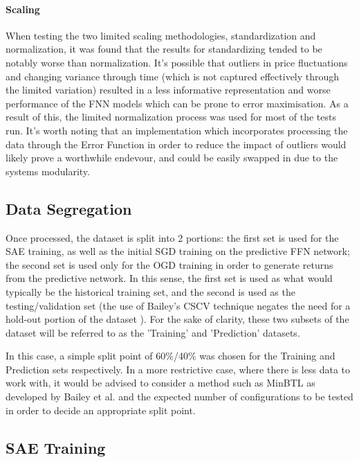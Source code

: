 \documentclass[a4paper,11pt,oneside]{article}
\theoremstyle{plain}
\theoremstyle{definition}
\begin{document}
\paragraph {Scaling} When testing the two limited scaling methodologies, standardization and normalization, it was found that the results for standardizing tended to be notably worse than normalization. It's possible that outliers in price fluctuations and changing variance through time (which is not captured effectively through the limited variation) resulted in a less informative representation and worse performance of the FNN models which can be prone to error maximisation. As a result of this, the limited normalization process was used for most of the tests run. It's worth noting that an implementation which incorporates processing the data through the Error Function in order to reduce the impact of outliers would likely prove a worthwhile endevour, and could be easily swapped in due to the systems modularity.\newline


\subsection{Data Segregation}\label{proc_dataseg}

Once processed, the dataset is split into 2 portions: the first set is used for the SAE training, as well as the initial SGD training on the predictive FFN network; the second set is used only for the OGD training in order to generate returns from the predictive network. In this sense, the first set is used as what would typically be the historical training set, and the second is used as the testing/validation set (the use of Bailey's CSCV technique negates the need for a hold-out portion of the dataset \cite{BailyPBO}). For the sake of clarity, these two subsets of the dataset will be referred to as the 'Training' and 'Prediction' datasets. \newline

In this case, a simple split point of 60\%/40\% was chosen for the Training and Prediction sets respectively. In a more restrictive case, where there is less data to work with, it would be advised to consider a method such as MinBTL as developed by Bailey et al. \cite{BaileyBTL} and the expected number of configurations to be tested in order to decide an appropriate split point.

\subsection{SAE Training}\label{proc_sae}
\end{document}
